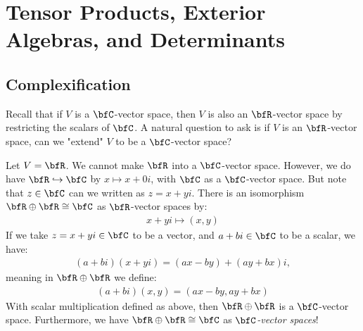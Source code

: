 \chapter{Tensor Products, Exterior Algebras, and Determinants}
\vspace{12pt}

\section{Complexification}
    Recall that if $V$ is a $\bfC$-vector space, then $V$ is also an $\bfR$-vector space by restricting the scalars of $\bfC$. A natural question to ask is if $V$ is an $\bfR$-vector space, can we "extend" $V$ to be a $\bfC$-vector space?

    \begin{example}
        Let $V = \bfR$. We cannot make $\bfR$ into a $\bfC$-vector space. However, we do have $\bfR \hookrightarrow \bfC$ by $x \mapsto x + 0i$, with $\bfC$ as a $\bfC$-vector space. But note that $z \in \bfC$ can we written as $z = x+yi$. There is an isomorphism $\bfR \oplus \bfR \cong \bfC$ as $\bfR$-vector spaces by:
            \begin{equation*}
            \begin{split}
                x+yi \mapsto (x,y)
            \end{split}
            \end{equation*}
        If we take $z = x+yi \in \bfC$ to be a vector, and $a+bi \in \bfC$ to be a scalar, we have:
            \begin{equation*}
            \begin{split}
                (a+bi)(x+yi) = (ax-by)+(ay+bx)i,
            \end{split}
            \end{equation*}
        meaning in $\bfR \oplus \bfR$ we define:
            \begin{equation*}
            \begin{split}
                (a+bi)(x,y) = (ax-by,ay+bx)
            \end{split}
            \end{equation*}
        With scalar multiplication defined as above, then $\bfR \oplus \bfR$ is a $\bfC$-vector space. Furthermore, we have $\bfR \oplus \bfR \cong \bfC$ as \textit{$\bfC$-vector spaces}!
    \end{example}

